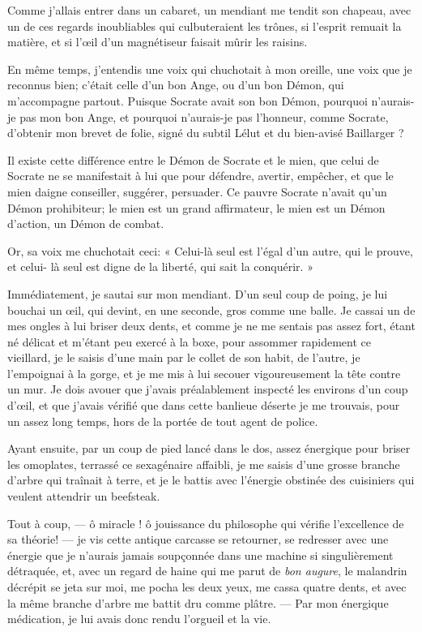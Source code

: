 Comme j’allais entrer dans un cabaret, un mendiant me
tendit son chapeau, avec un de ces regards inoubliables qui
culbuteraient les trônes, si l’esprit remuait la
matière, et si l’\oe il d’un
magnétiseur faisait mûrir les raisins.

En même temps, j’entendis une voix qui chuchotait à mon
oreille, une voix que je reconnus bien; c’était celle
d’un bon Ange, ou d’un bon Démon, qui
m’accompagne partout. Puisque Socrate avait son bon
Démon, pourquoi n’aurais{}-je pas mon bon Ange, et
pourquoi n’aurais{}-je pas l’honneur,
comme Socrate, d’obtenir mon brevet de folie, signé du
subtil Lélut et du bien{}-avisé Baillarger ?

Il existe cette différence entre le Démon de Socrate et le mien, que
celui de Socrate ne se manifestait à lui que pour défendre, avertir,
empêcher, et que le mien daigne conseiller, suggérer, persuader. Ce
pauvre Socrate n’avait qu’un Démon
prohibiteur; le mien est un grand affirmateur, le mien est un Démon
d’action, un Démon de combat.

Or, sa voix me chuchotait ceci: « Celui{}-là seul est
l’égal d’un autre, qui le prouve, et
celui{}- là seul est digne de la liberté, qui sait la conquérir. »

Immédiatement, je sautai sur mon mendiant. D’un seul
coup de poing, je lui bouchai un \oe il, qui devint, en une seconde, gros
comme une balle. Je cassai un de mes ongles à lui briser deux dents, et
comme je ne me sentais pas assez fort, étant né délicat et
m’étant peu exercé à la boxe, pour assommer rapidement
ce vieillard, je le saisis d’une main par le collet de
son habit, de l’autre, je l’empoignai
à la gorge, et je me mis à lui secouer vigoureusement la tête contre un
mur. Je dois avouer que j’avais préalablement inspecté
les environs d’un coup d’\oe il, et que
j’avais vérifié que dans cette banlieue déserte je me
trouvais, pour un assez long temps, hors de la portée de tout agent de
police.

Ayant ensuite, par un coup de pied lancé dans le dos, assez énergique
pour briser les omoplates, terrassé ce sexagénaire affaibli, je me
saisis d’une grosse branche d’arbre
qui traînait à terre, et je le battis avec l’énergie
obstinée des cuisiniers qui veulent attendrir un beefsteak.

Tout à coup, --- ô miracle ! ô jouissance du philosophe qui vérifie
l’excellence de sa théorie! --- je vis cette antique
carcasse se retourner, se redresser avec une énergie que je
n’aurais jamais soupçonnée dans une machine si
singulièrement détraquée, et, avec un regard de haine qui me parut de
\textit{bon augure}, le malandrin décrépit se jeta sur moi, me pocha les deux
yeux, me cassa quatre dents, et avec la même branche
d’arbre me battit dru comme plâtre. --- Par mon
énergique médication, je lui avais donc rendu
l’orgueil et la vie.

